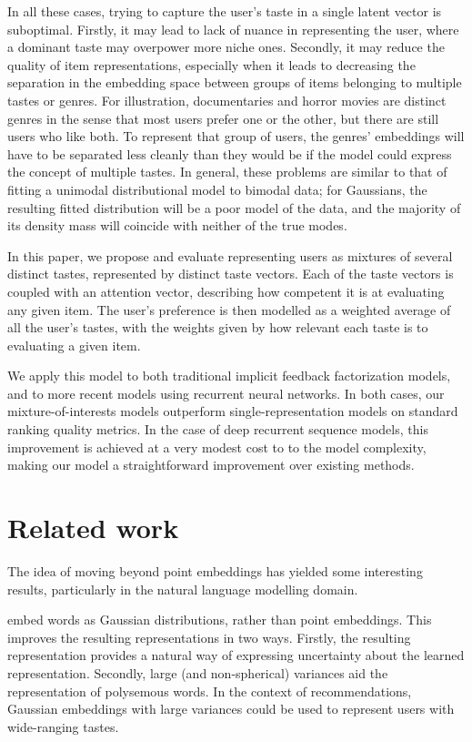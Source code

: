 \documentclass[sigconf]{acmart}
\begin{document}
In all these cases, trying to capture the user's taste in a single latent vector is suboptimal. Firstly, it may lead to lack of nuance in representing the user, where a dominant taste may overpower more niche ones. Secondly, it may reduce the quality of item representations, especially when it leads to decreasing the separation in the embedding space between groups of items belonging to multiple tastes or genres. For illustration, documentaries and horror movies are distinct genres in the sense that most users prefer one or the other, but there are still users who like both. To represent that group of users, the genres' embeddings will have to be separated less cleanly than they would be if the model could express the concept of multiple tastes. In general, these problems are similar to that of fitting a unimodal distributional model to bimodal data; for Gaussians, the resulting fitted distribution will be a poor model of the data, and the majority of its density mass will coincide with neither of the true modes.

In this paper, we propose and evaluate representing users as mixtures of several distinct tastes, represented by distinct taste vectors. Each of the taste vectors is coupled with an attention vector, describing how competent it is at evaluating any given item. The user's preference is then modelled as a weighted average of all the user's tastes, with the weights given by how relevant each taste is to evaluating a given item.

We apply this model to both traditional implicit feedback factorization models, and to more recent models using recurrent neural networks. In both cases, our mixture-of-interests models outperform single-representation models on standard ranking quality metrics. In the case of deep recurrent sequence models, this improvement is achieved at a very modest cost to to the model complexity, making our model a straightforward improvement over existing methods.

\section{Related work}
The idea of moving beyond point embeddings has yielded some interesting results, particularly in the natural language modelling domain.

\citet{vilnis2014word} embed words as Gaussian distributions, rather than point embeddings. This improves the resulting representations in two ways. Firstly, the resulting representation provides a natural way of expressing uncertainty about the learned representation. Secondly, large (and non-spherical) variances aid the representation of polysemous words. In the context of recommendations, Gaussian embeddings with large variances could be used to represent users with wide-ranging tastes.
\end{document}
